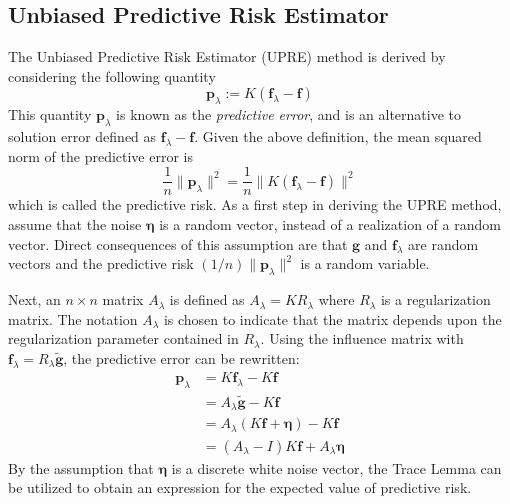 \documentclass[12pt]{article}
\newcommand{\gdis}{\mathbf{g}}
\newcommand{\gnoise}{\widetilde{\mathbf{g}}}
\newcommand{\kmat}{K}	%
\newcommand{\fdis}{\mathbf{f}}
\newcommand{\regparam}{\lambda}
\newcommand{\R}{R_{\regparam}}	%
\newcommand{\freg}{\fdis_{\regparam}}	%
\newcommand{\noise}{\bm{\eta}}	%
\newcommand{\PE}{\mathbf{p}_{\regparam}}	%
\newcommand{\A}{A_{\regparam}}	%
\begin{document}
\subsection{Unbiased Predictive Risk Estimator} \label{Unbiased Predictive Risk Estimator}
The Unbiased Predictive Risk Estimator (UPRE) method is derived by considering the following quantity
\[\PE := \kmat(\freg - \fdis)\]
This quantity $\PE$ is known as the \textit{predictive error}, and is an alternative to solution error defined as $\freg - \fdis$. Given the above definition, the mean squared norm of the predictive error is
\[\frac{1}{n}\|\PE\|^2 = \frac{1}{n}\|\kmat(\freg - \fdis)\|^2\]
which is called the predictive risk.  As a first step in deriving the UPRE method, assume that the noise $\noise$ is a random vector, instead of a realization of a random vector. Direct consequences of this assumption are that $\gdis$ and $\freg$ are random vectors and the predictive risk $(1/n)\|\PE\|^2$ is a random variable. \par
Next, an $n \times n$ matrix $\A$ is defined as $\A = \kmat\R$ where $\R$ is a regularization matrix. The notation $\A$ is chosen to indicate that the matrix depends upon the regularization parameter contained in $\R$. Using the influence matrix with $\freg = \R\gnoise$, the predictive error can be rewritten:
\begin{align*}
\PE &= \kmat\freg - \kmat\fdis \\
&= \A\gnoise - \kmat\fdis \\
&= \A(\kmat\fdis + \noise) - \kmat\fdis \\
&= (\A - I)\kmat\fdis + \A\noise
\end{align*}
By the assumption that $\noise$ is a discrete white noise vector, the Trace Lemma can be utilized to obtain an expression for the expected value of predictive risk.
\end{document}
